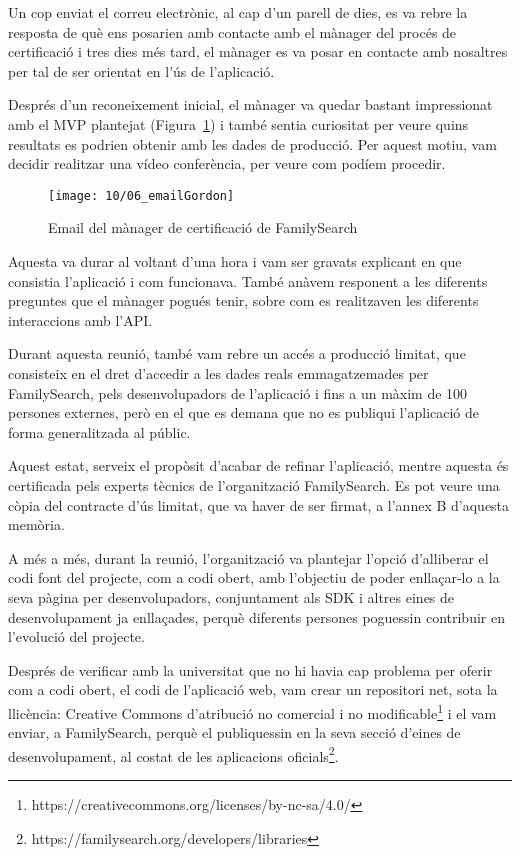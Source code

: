     Un cop enviat el correu electrònic, al cap d’un parell de dies, es va rebre la resposta de què ens posarien amb contacte amb el mànager del procés de certificació i tres dies més tard, el mànager es va posar en contacte amb nosaltres per tal de ser orientat en l’ús de l’aplicació.

    Després d’un reconeixement inicial, el mànager va quedar bastant impressionat amb el MVP plantejat (Figura~\ref{fig:gordonEmail}) i també sentia curiositat per veure quins resultats es podrien obtenir amb les dades de producció. Per aquest motiu, vam decidir realitzar una vídeo conferència, per veure com podíem procedir.

    \begin{figure}[h]
        \texttt{[image: 10/06\_emailGordon]}
        \centering
        \caption{Email del mànager de certificació de FamilySearch}\label{fig:gordonEmail}
    \end{figure}

    Aquesta va durar al voltant d’una hora i vam ser gravats explicant en que consistia l’aplicació i com funcionava. També anàvem responent a les diferents preguntes que el mànager pogués tenir, sobre com es realitzaven les diferents interaccions amb l’API.

    Durant aquesta reunió, també vam rebre un accés a producció limitat, que consisteix en el dret d’accedir a les dades reals emmagatzemades per FamilySearch, pels desenvolupadors de l'aplicació i fins a un màxim de 100 persones externes, però en el que es demana que no es publiqui l’aplicació de forma generalitzada al públic.

    Aquest estat, serveix el propòsit d’acabar de refinar l’aplicació, mentre aquesta és certificada pels experts tècnics de l’organització FamilySearch. Es pot veure una còpia del contracte d’ús limitat, que va haver de ser firmat, a l’annex B d'aquesta memòria.

    A més a més, durant la reunió, l’organització va plantejar l’opció d’alliberar el codi font del projecte, com a codi obert, amb l’objectiu de poder enllaçar-lo a la seva pàgina per desenvolupadors, conjuntament als SDK i altres eines de desenvolupament ja enllaçades, perquè diferents persones poguessin contribuir en l’evolució del projecte.

    Després de verificar amb la universitat que no hi havia cap problema per oferir com a codi obert, el codi de l'aplicació web, vam crear un repositori net, sota la llicència: Creative Commons d'atribució no comercial i no modificable\footnote{https://creativecommons.org/licenses/by-nc-sa/4.0/} i el vam enviar, a FamilySearch, perquè el publiquessin en la seva secció d'eines de desenvolupament, al costat de les aplicacions oficials\footnote{https://familysearch.org/developers/libraries}.

